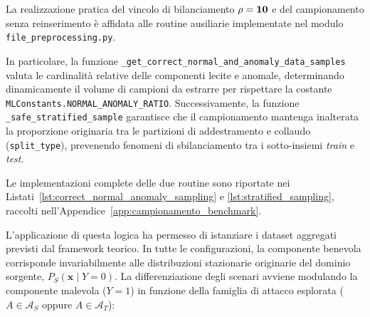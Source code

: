 La realizzazione pratica del vincolo di bilanciamento $\bf{\rho = 10}$ e del campionamento senza reinserimento è affidata alle routine ausiliarie implementate nel modulo \texttt{file\_preprocessing.py}. 

In particolare, la funzione \texttt{\_get\_correct\_normal\_and\_anomaly\_data\_samples} valuta le cardinalità relative delle componenti lecite e anomale, determinando dinamicamente il volume di campioni da estrarre per rispettare la costante \texttt{MLConstants.NORMAL\_ANOMALY\_RATIO}. 
Successivamente, la funzione \texttt{\_safe\_stratified\_sample} garantisce che il campionamento mantenga inalterata la proporzione originaria tra le partizioni di addestramento e collaudo (\texttt{split\_type}), prevenendo fenomeni di sbilanciamento tra i sotto-insiemi \textit{train} e \textit{test}.

Le implementazioni complete delle due routine sono riportate nei Listati~\ref{lst:correct_normal_anomaly_sampling} e \ref{lst:stratified_sampling}, raccolti nell'Appendice~\ref{app:campionamento_benchmark}.

L'applicazione di questa logica ha permesso di istanziare i dataset aggregati previsti dal framework teorico. 
In tutte le configurazioni, la componente benevola corrisponde invariabilmente alle distribuzioni stazionarie originarie del dominio sorgente, $P_S(\mathbf{x} \mid Y = 0)$. 
La differenziazione degli scenari avviene modulando la componente malevola ($Y=1$) in funzione della famiglia di attacco esplorata ($A \in \mathcal{A}_S$ oppure $A \in \mathcal{A}_T$):

